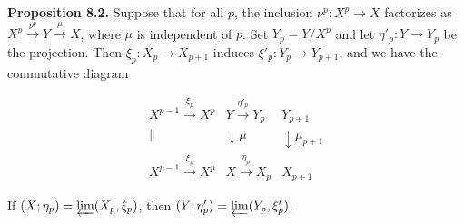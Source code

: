 \textbf{Proposition 8.2.} Suppose that for all $p$, the inclusion $\nu^p : X^p \to X$ factorizes as $X^p \xrightarrow{\nu^p} Y \xrightarrow{\mu} X$, where $\mu$ is independent of $p$. Set $Y_p = Y / X^p$ and let $\eta'_p : Y \to Y_p$ be the projection. Then $\xi_p : X_p \to X_{p+1}$ induces $\xi'_p : Y_p \to Y_{p+1}$, and we have the commutative diagram

$$
\begin{array}{ccccc}
X^{p-1} \xrightarrow{\xi_p} X^p & Y \xrightarrow{\eta'_p} Y_p & Y_{p+1} \\
\parallel & \downarrow{\scriptstyle \mu} & \downarrow{\scriptstyle \mu_{p+1}} \\
X^{p-1} \xrightarrow{\xi_p} X^p & X \xrightarrow{\eta_p} X_p & X_{p+1}
\end{array}
$$

If $(X; \eta_p) = \varprojlim (X_p, \xi_p)$, then $(Y; \eta'_p) = \varprojlim (Y_p, \xi'_p)$.
